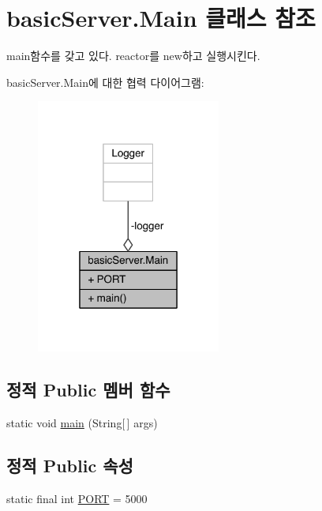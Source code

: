 \hypertarget{classbasic_server_1_1_main}{\section{basic\+Server.\+Main 클래스 참조}
\label{classbasic_server_1_1_main}
}


main함수를 갖고 있다. reactor를 new하고 실행시킨다.  




basic\+Server.\+Main에 대한 협력 다이어그램\+:\nopagebreak
\begin{figure}[H]
\begin{center}
\leavevmode
\includegraphics[width=172pt]{classbasic_server_1_1_main__coll__graph}
\end{center}
\end{figure}
\subsection*{정적 Public 멤버 함수}
\begin{DoxyCompactItemize}
\item 
static void \hyperlink{classbasic_server_1_1_main_a0c7ee477ff533ef286ecf5a95148eda8}{main} (String\mbox{[}$\,$\mbox{]} args)
\end{DoxyCompactItemize}
\subsection*{정적 Public 속성}
\begin{DoxyCompactItemize}
\item 
static final int \hyperlink{classbasic_server_1_1_main_af83ee27a3ec7ae49bcfed0bc78bd32ca}{P\+O\+R\+T} = 5000
\end{DoxyCompactItemize}
